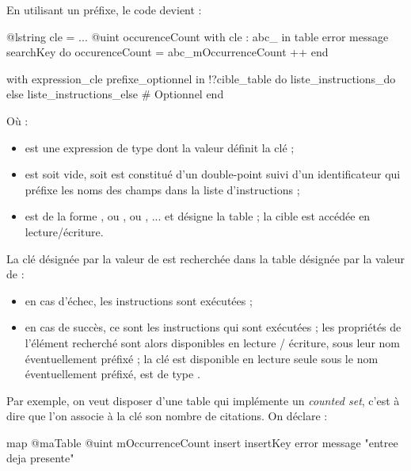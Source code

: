 {{{En utilisant un préfixe, le code devient :
\begin{galgascode}
@lstring cle = ...
@uint occurenceCount
with cle : abc_ in table error message searchKey do
  occurenceCount = abc_mOccurrenceCount ++
end
\end{galgascode}







\begin{galgascode}
with expression_cle prefixe_optionnel in !?cible_table
do liste_instructions_do
else liste_instructions_else # Optionnel
end
\end{galgascode}


Où :
\begin{itemize}
  \item {} est une expression de type  dont la valeur définit la clé ;
  \item {} est soit vide, soit est constitué d'un double-point \galgast{:} suivi d'un identificateur qui préfixe les noms des champs dans la liste d'instructions  ;
  \item {} est de la forme , ou  , ou , ... et désigne la table ; la cible est accédée en lecture/écriture.
\end{itemize}

La clé désignée par la valeur de  est recherchée dans la table désignée par la valeur de  :
\begin{itemize}
  \item en cas d'échec, les instructions  sont exécutées ;
  \item en cas de succès, ce sont les instructions  qui sont exécutées ; les propriétés de l'élément recherché sont alors disponibles en lecture / écriture, sous leur nom éventuellement préfixé ; la clé est disponible en lecture seule sous le nom  éventuellement préfixé, est de type .
\end{itemize}

Par exemple, on veut disposer d'une table qui implémente un \emph{counted set}, c'est à dire que l'on associe à la clé son nombre de citations. On déclare :
\begin{galgascode}
map @maTable {
  @uint mOccurrenceCount
  insert insertKey error message "entree deja presente"
}
\end{galgascode}

}}}
